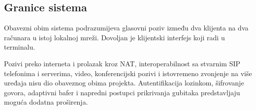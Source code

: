 \subsection{Granice sistema}

Obavezni obim sistema podrazumijeva glasovni poziv između dva klijenta na dva računara u istoj lokalnoj mreži. Dovoljan je klijentski interfejs koji radi u terminalu.

Pozivi preko interneta i prolazak kroz NAT, interoperabilnost sa stvarnim SIP telefonima i serverima, video, konferencijski pozivi i istovremeno zvonjenje na više uređaja nisu dio obaveznog obima projekta. Autentifikacija lozinkom, šifrovanje govora, adaptivni bafer i napredni postupci prikrivanja gubitaka predstavljaju moguća dodatna proširenja.
